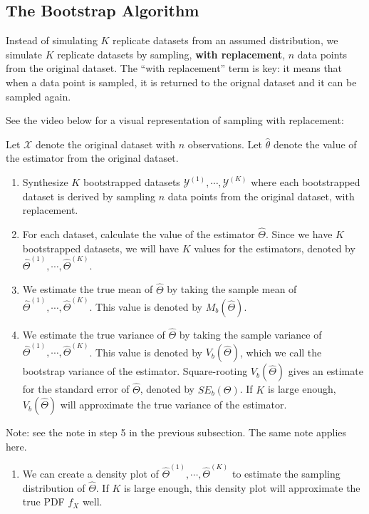 \documentclass[
]{book}
\providecommand{\tightlist}{%
  \setlength{\itemsep}{0pt}\setlength{\parskip}{0pt}}
\begin{document}
\subsection{The Bootstrap Algorithm}\label{the-bootstrap-algorithm}

Instead of simulating \(K\) replicate datasets from an assumed distribution, we simulate \(K\) replicate datasets by sampling, \textbf{with replacement}, \(n\) data points from the original dataset. The ``with replacement'' term is key: it means that when a data point is sampled, it is returned to the orignal dataset and it can be sampled again.

See the video below for a visual representation of sampling with replacement:

Let \(\mathcal{X}\) denote the original dataset with \(n\) observations. Let \(\hat{\theta}\) denote the value of the estimator from the original dataset.

\begin{enumerate}
\def\labelenumi{\arabic{enumi}.}
\item
  Synthesize \(K\) bootstrapped datasets \(\mathcal{Y}^{(1)}, \cdots, \mathcal{Y}^{(K)}\) where each bootstrapped dataset is derived by sampling \(n\) data points from the original dataset, with replacement.
\item
  For each dataset, calculate the value of the estimator \(\hat{\Theta}\). Since we have \(K\) bootstrapped datasets, we will have \(K\) values for the estimators, denoted by \(\hat{\Theta}^{(1)}, \cdots, \hat{\Theta}^{(K)}\).
\item
  We estimate the true mean of \(\hat{\Theta}\) by taking the sample mean of \(\hat{\Theta}^{(1)}, \cdots, \hat{\Theta}^{(K)}\). This value is denoted by \(M_b(\hat{\Theta})\).
\item
  We estimate the true variance of \(\hat{\Theta}\) by taking the sample variance of \(\hat{\Theta}^{(1)}, \cdots, \hat{\Theta}^{(K)}\). This value is denoted by \(V_b(\hat{\Theta})\), which we call the bootstrap variance of the estimator. Square-rooting \(V_b(\hat{\Theta})\) gives an estimate for the standard error of \(\hat{\Theta}\), denoted by \(SE_b(\Theta)\). If \(K\) is large enough, \(V_b(\hat{\Theta})\) will approximate the true variance of the estimator.
\end{enumerate}

Note: see the note in step 5 in the previous subsection. The same note applies here.

\begin{enumerate}
\def\labelenumi{\arabic{enumi}.}
\setcounter{enumi}{4}
\tightlist
\item
  We can create a density plot of \(\hat{\Theta}^{(1)}, \cdots, \hat{\Theta}^{(K)}\) to estimate the sampling distribution of \(\hat{\Theta}\). If \(K\) is large enough, this density plot will approximate the true PDF \(f_X\) well.
\end{enumerate}
\end{document}
